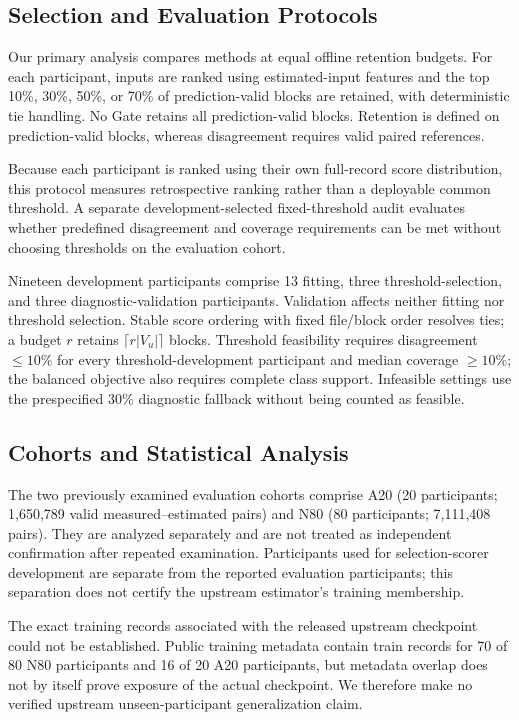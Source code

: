 \subsection{Selection and Evaluation Protocols}\label{selection-and-evaluation-protocols}
Our primary analysis compares methods at equal offline retention budgets. For each participant, inputs are ranked using estimated-input features and the top 10\%, 30\%, 50\%, or 70\% of prediction-valid blocks are retained, with deterministic tie handling. No Gate retains all prediction-valid blocks. Retention is defined on prediction-valid blocks, whereas disagreement requires valid paired references.

Because each participant is ranked using their own full-record score distribution, this protocol measures retrospective ranking rather than a deployable common threshold. A separate development-selected fixed-threshold audit evaluates whether predefined disagreement and coverage requirements can be met without choosing thresholds on the evaluation cohort.

Nineteen development participants comprise 13 fitting, three threshold-selection, and three diagnostic-validation participants. Validation affects neither fitting nor threshold selection. Stable score ordering with fixed file/block order resolves ties; a budget \(r\) retains \(\lceil r|V_u|\rceil\) blocks. Threshold feasibility requires disagreement \(\leq10\%\) for every threshold-development participant and median coverage \(\geq10\%\); the balanced objective also requires complete class support. Infeasible settings use the prespecified 30\% diagnostic fallback without being counted as feasible.

\subsection{Cohorts and Statistical Analysis}\label{cohorts-and-statistical-analysis}
The two previously examined evaluation cohorts comprise A20 (20 participants; 1,650,789 valid measured--estimated pairs) and N80 (80 participants; 7,111,408 pairs). They are analyzed separately and are not treated as independent confirmation after repeated examination. Participants used for selection-scorer development are separate from the reported evaluation participants; this separation does not certify the upstream estimator's training membership.

The exact training records associated with the released upstream checkpoint could not be established. Public training metadata contain train records for 70 of 80 N80 participants and 16 of 20 A20 participants, but metadata overlap does not by itself prove exposure of the actual checkpoint. We therefore make no verified upstream unseen-participant generalization claim.

